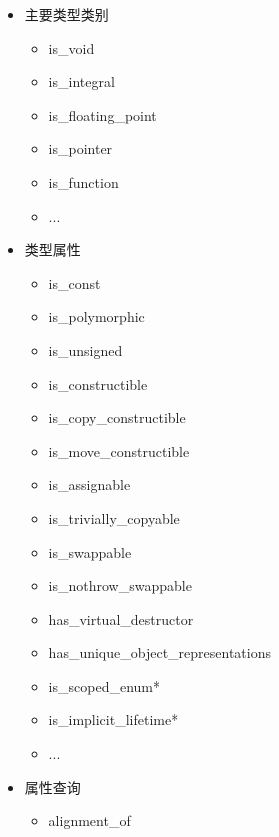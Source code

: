 \begin{itemize}
\item
主要类型类别
\begin{itemize}
\item
is\_void

\item
is\_integral

\item
is\_floating\_point

\item
is\_pointer

\item
is\_function

\item
...
\end{itemize}

\item
类型属性
\begin{itemize}
\item
is\_const

\item
is\_polymorphic

\item
is\_unsigned

\item
is\_constructible

\item
is\_copy\_constructible

\item
is\_move\_constructible

\item
is\_assignable

\item
is\_trivially\_copyable

\item
is\_swappable

\item
is\_nothrow\_swappable

\item
has\_virtual\_destructor

\item
has\_unique\_object\_representations

\item
is\_scoped\_enum*

\item
is\_implicit\_lifetime*

\item
...
\end{itemize}

\item
属性查询
\begin{itemize}
\item
alignment\_of


\end{itemize}
\end{itemize}
